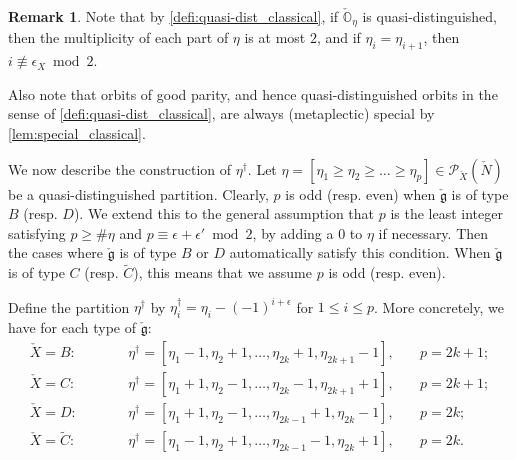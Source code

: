 \documentclass[11pt, a4paper]{amsart}
\newcommand{\orb}{\mathbb{O}}
\newcommand{\fg}{\mathfrak{g}}
\newcommand{\ckfg}{{\check{\fg}}}
\newcommand{\ckorb}{\check{\orb}}
\newcommand{\cP}{\mathcal{P}}
\newcommand{\mC}{\widetilde{C}}
\theoremstyle{definition}
\newtheorem{Rem}[Thm]{Remark}
\numberwithin{equation}{section}
\begin{document}
\begin{Rem} \label{rem:quasi-dist_classical}
Note that by \cref{defi:quasi-dist_classical}, if $\ckorb_\eta$ is quasi-distinguished, then the multiplicity of each part of $\eta$ is at most $2$, and if $\eta_i = \eta_{i+1}$, then $i \not\equiv \epsilon_X \bmod 2$. 

Also note that orbits of good parity, and hence quasi-distinguished orbits in the sense of \cref{defi:quasi-dist_classical}, are always (metaplectic) special by \cref{lem:special_classical}.
\end{Rem}

We now describe the construction of $\eta^\dagger$. Let $\eta = [\eta_1 \geqslant \eta_2 \geqslant \ldots \geqslant \eta_p] \in \cP_{\check{X}}(\check{N})$ be a quasi-distinguished partition. 
Clearly, $p$ is odd (resp. even) when $\ckfg$ is of type $B$ (resp. $D$). We extend this to the general assumption that $p$ is the least integer satisfying $p \geqslant \#\eta$ and $p \equiv \epsilon + \epsilon' \bmod 2$, by adding a $0$ to $\eta$ if necessary. Then the cases where $\ckfg$ is of type $B$ or $D$ automatically satisfy this condition. When $\ckfg$ is of type $C$ (resp. $\mC$), this means that we assume $p$ is odd (resp. even). 

Define the partition $\eta^\dagger$ by $\eta^\dagger_i = \eta_i - (-1)^{i+\epsilon}$ for $1 \leqslant i \leqslant p$. More concretely, we have for each type of $\ckfg$:
\begin{equation}\label{eq:eta_dagger}
\begin{aligned}
	\check{X} = B: &\qquad& \eta^\dagger = [\eta_1 - 1, \eta_2 + 1, \ldots, \eta_{2k} + 1, \eta_{2k+1} - 1], &\quad p = 2k + 1; \\
	\check{X} = C: &\qquad& \eta^\dagger = [\eta_1 + 1, \eta_2 - 1, \ldots, \eta_{2k} - 1, \eta_{2k+1} + 1], &\quad p = 2k + 1; \\
	\check{X} = D: &\qquad& \eta^\dagger = [\eta_1 + 1, \eta_2 - 1, \ldots, \eta_{2k-1} + 1, \eta_{2k} - 1], &\quad p = 2k; \\
	\check{X} = \mC: &\qquad& \eta^\dagger = [\eta_1 - 1, \eta_2 + 1, \ldots, \eta_{2k-1} - 1, \eta_{2k} + 1], &\quad p = 2k. \\
\end{aligned}
\end{equation}
\end{document}
